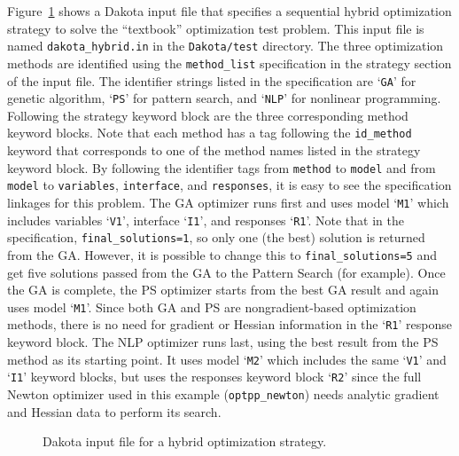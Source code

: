 
Figure~\ref{strat:figure01} shows a Dakota input file that specifies
a sequential hybrid optimization strategy to solve the
``textbook'' optimization test problem. This input file is named
\texttt{dakota\_hybrid.in} in the \texttt{Dakota/test} directory.
The three optimization methods are identified using the
\texttt{method\_list} specification in the strategy section of the
input file. The identifier strings listed in the specification are
`\texttt{GA}' for genetic algorithm, `\texttt{PS}' for pattern search,
and `\texttt{NLP}' for nonlinear programming. Following the strategy
keyword block are the three corresponding method keyword blocks. Note
that each method has a tag following the \texttt{id\_method} keyword
that corresponds to one of the method names listed in the strategy
keyword block. By following the identifier tags from \texttt{method}
to \texttt{model} and from \texttt{model} to \texttt{variables},
\texttt{interface}, and \texttt{responses}, it is easy to see the
specification linkages for this problem. The GA optimizer runs first
and uses model `\texttt{M1}' which includes variables `\texttt{V1}',
interface `\texttt{I1}', and responses `\texttt{R1}'. 
Note that in the specification, \texttt{final\_solutions=1}, 
so only one (the best) solution is returned from the GA.  
However, it is possible to change this to \texttt{final\_solutions=5}
and get five solutions passed from the GA to the Pattern Search
(for example).  Once the GA is complete, the PS optimizer starts from the 
best GA result and again
uses model `\texttt{M1}'. Since both GA and PS are nongradient-based
optimization methods, there is no need for gradient or Hessian
information in the `\texttt{R1}' response keyword block. The NLP
optimizer runs last, using the best result from the PS method as its
starting point.  It uses model `\texttt{M2}' which includes the same
`\texttt{V1}' and `\texttt{I1}' keyword blocks, but uses the responses
keyword block `\texttt{R2}' since the full Newton optimizer used in
this example (\texttt{optpp\_newton}) needs analytic gradient and
Hessian data to perform its search.
\begin{figure}
  \centering
  \begin{bigbox}
    \begin{tiny}
    \end{tiny}
  \end{bigbox}
  \caption{Dakota input file for a hybrid optimization strategy.}
  \label{strat:figure01}
\end{figure}

